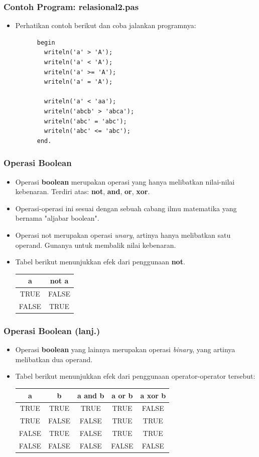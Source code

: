\begin{frame}[fragile]
\frametitle{Contoh Program: relasional2.pas}
\begin{itemize}
  \item Perhatikan contoh berikut dan coba jalankan programnya:
    \begin{lstlisting}
      begin
        writeln('a' > 'A');
        writeln('a' < 'A');
        writeln('a' >= 'A');
        writeln('a' = 'A');

        writeln('a' < 'aa');
        writeln('abcb' > 'abca');
        writeln('abc' = 'abc');
        writeln('abc' <= 'abc');
      end.
    \end{lstlisting}
\end{itemize}
\end{frame}

\begin{frame}
\frametitle{Operasi Boolean}
\begin{itemize}
  \item Operasi \textbf{boolean} merupakan operasi yang hanya melibatkan nilai-nilai kebenaran. Terdiri atas: \textbf{not}, \textbf{and}, \textbf{or}, \textbf{xor}.
  \item Operasi-operasi ini sesuai dengan sebuah cabang ilmu matematika yang bernama "aljabar boolean".
  \item Operasi \alert{not} merupakan operasi \textit{unary}, artinya hanya melibatkan satu operand. Gunanya untuk membalik nilai kebenaran.
  \item Tabel berikut menunjukkan efek dari penggunaan \textbf{not}.
  \begin{tabular}{|c|c|}
  \hline a & not a \\
  \hline TRUE & FALSE \\
  \hline FALSE & TRUE \\
  \hline
  \end{tabular}
\end{itemize}
\end{frame}

\begin{frame}
\frametitle{Operasi Boolean (lanj.)}
\begin{itemize}
  \item Operasi \textbf{boolean} yang lainnya merupakan operasi \textit{binary}, yang artinya melibatkan dua operand.
  \item Tabel berikut menunjukkan efek dari penggunaan operator-operator tersebut:
  \begin{tabular}{|c|c|c|c|c|}
  \hline a & b & a and b & a or b & a xor b \\
  \hline TRUE & TRUE & TRUE & TRUE & FALSE \\
  \hline TRUE & FALSE & FALSE & TRUE & TRUE \\
  \hline FALSE & TRUE & FALSE & TRUE & TRUE\\
  \hline FALSE & FALSE & FALSE & FALSE & FALSE \\
  \hline
  \end{tabular}
\end{itemize}
\end{frame}

